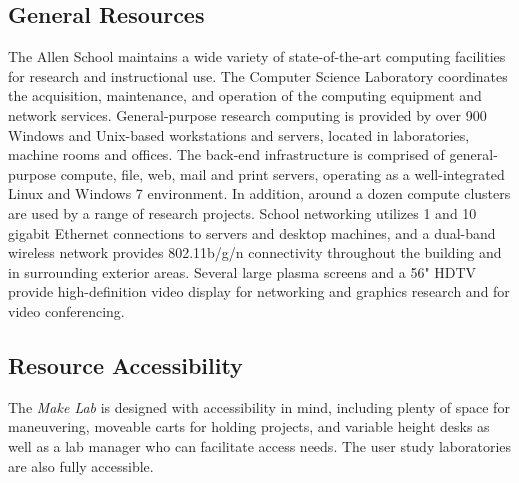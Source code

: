 \subsection{General Resources}
The Allen School maintains a wide variety of state-of-the-art computing facilities for research and instructional use. The Computer Science Laboratory coordinates the acquisition, maintenance, and operation of the computing equipment and network services. General-purpose research computing is provided by over 900 Windows and Unix-based workstations and servers, located in laboratories, machine rooms and offices. The back-end infrastructure is comprised of general-purpose compute, file, web, mail and print servers, operating as a well-integrated Linux and Windows 7 environment. In addition, around a dozen compute clusters are used by a range of research projects. School networking utilizes 1 and 10 gigabit Ethernet connections to servers and desktop machines, and a dual-band wireless network provides 802.11b/g/n connectivity throughout the building and in surrounding exterior areas. Several large plasma screens and a 56" HDTV provide high-definition video display for networking and graphics research and for video conferencing.

\subsection{Resource Accessibility}
The \textit{Make Lab} is designed with accessibility in mind, including plenty of space for maneuvering, moveable carts for holding projects, and variable height desks as well as a lab manager who can facilitate access needs. The user study laboratories are also fully accessible.


